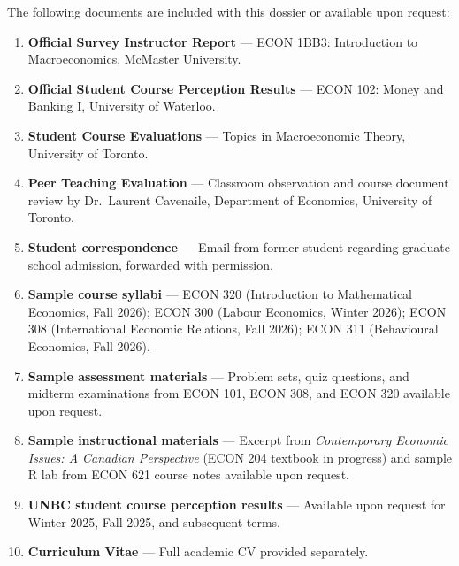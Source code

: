 \documentclass[11pt,letterpaper]{article}
\begin{document}
The following documents are included with this dossier or available upon request:

\begin{enumerate}
  \item \textbf{Official Survey Instructor Report} --- ECON 1BB3: Introduction to Macroeconomics, McMaster University.
  \item \textbf{Official Student Course Perception Results} --- ECON 102: Money and Banking I, University of Waterloo.
  \item \textbf{Student Course Evaluations} --- Topics in Macroeconomic Theory, University of Toronto.
  \item \textbf{Peer Teaching Evaluation} --- Classroom observation and course document review by Dr.\ Laurent Cavenaile, Department of Economics, University of Toronto.
  \item \textbf{Student correspondence} --- Email from former student regarding graduate school admission, forwarded with permission.
  \item \textbf{Sample course syllabi} --- ECON 320 (Introduction to Mathematical Economics, Fall 2026); ECON 300 (Labour Economics, Winter 2026); ECON 308 (International Economic Relations, Fall 2026); ECON 311 (Behavioural Economics, Fall 2026).
  \item \textbf{Sample assessment materials} --- Problem sets, quiz questions, and midterm examinations from ECON 101, ECON 308, and ECON 320 available upon request.
  \item \textbf{Sample instructional materials} --- Excerpt from \textit{Contemporary Economic Issues: A Canadian Perspective} (ECON 204 textbook in progress) and sample R lab from ECON 621 course notes available upon request.
  \item \textbf{UNBC student course perception results} --- Available upon request for Winter 2025, Fall 2025, and subsequent terms.
  \item \textbf{Curriculum Vitae} --- Full academic CV provided separately.
\end{enumerate}
\end{document}
